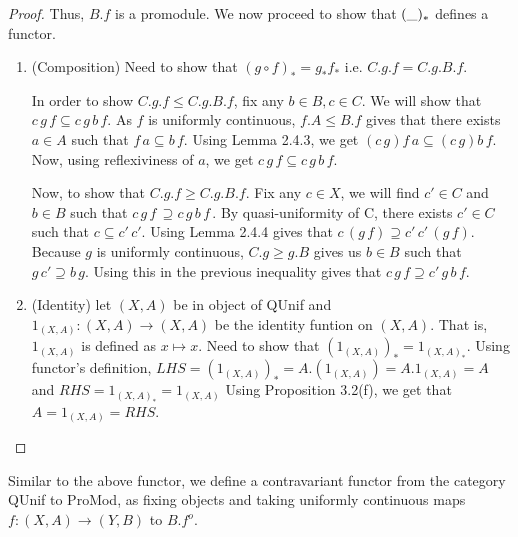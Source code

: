 \documentclass[18pt,a4paper]{article}
\theoremstyle{definition}
\begin{document}
\begin{proof}
	Thus, $B.f$ is a promodule. We now proceed to show that $(\string _)_*$ defines a functor.
	\begin{enumerate}[label=(\roman*)]
		\item (Composition) Need to show that $(g\circ f)_*=g_*f_*$ i.e. $C.g.f=C.g.B.f$.

			In order to show $C.g.f \leq C.g.B.f$, fix any $b\in B, c\in C$.
			We will show that $c\,g\,f \subseteq c\,g\,b\,f$. As $f$ is uniformly
			continuous, $f.A \leq B.f$ gives that there exists $a \in A$ such that
			$f\,a \subseteq b\,f$. Using Lemma 2.4.3, we get $(c\,g)f\,a \subseteq
			(c\,g)b\,f$. Now, using reflexiviness of $a$, we get $c\,g\,f \subseteq
			c\,g\,b\,f$.

			Now, to show that $C.g.f \geq C.g.B.f$. Fix any $c \in X$, we will find $c' \in C$ and
			$b \in B$ such that $c\, g\, f\, \supseteq c\, g\, b\, f\, $. By quasi-uniformity of C,
			there exists $c' \in C$ such that $c \subseteq  c'\, c'$. Using Lemma 2.4.4
			gives that $c\, (g\, f)\supseteq c'\, c'\, (g\, f) $. Because $g$ is uniformly
			continuous, $C.g \geq g.B$ gives us $b\in B$ such that $g\, c' \supseteq b\, g$.
			Using this in the previous inequality gives that $c\, g\, f \supseteq c'\, g\, b\, f$.

		\item(Identity) let $(X,A)$ be in object of QUnif and
			$1_{(X,A)}:(X,A)\to(X,A)$ be the identity funtion on $(X,A)$. That is,
			$1_{(X,A)}$ is defined as $x\mapsto x$.
			Need to show that $(1_{(X,A)})_*=1_{(X,A)_*}$. Using
			functor's definition, $LHS=(1_{(X,A)})_*=A.(1_{(X,A)})=A.1_{(X,A)}=A$
			and $RHS=1_{(X,A)_*}=1_{(X,A)}$
			Using Proposition 3.2(f), we get that $A=1_{(X,A)}=RHS$. \qedhere
	\end{enumerate}
\end{proof}


Similar to the above functor, we define a contravariant functor from the category QUnif to ProMod,
as fixing objects and taking uniformly continuous maps $f:(X,A)\to(Y,B)$ to $B.f^o$.
\end{document}
